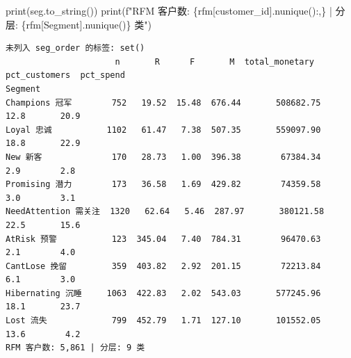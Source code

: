 \documentclass[
]{ctexart}
\newenvironment{Shaded}{\begin{snugshade}}{\end{snugshade}}
\newcommand{\BuiltInTok}[1]{\textcolor[rgb]{0.00,0.23,0.31}{#1}}
\newcommand{\NormalTok}[1]{\textcolor[rgb]{0.00,0.23,0.31}{#1}}
\newcommand{\SpecialCharTok}[1]{\textcolor[rgb]{0.37,0.37,0.37}{#1}}
\newcommand{\SpecialStringTok}[1]{\textcolor[rgb]{0.13,0.47,0.30}{#1}}
\newcommand{\StringTok}[1]{\textcolor[rgb]{0.13,0.47,0.30}{#1}}
\begin{document}
\begin{Shaded}
\begin{Highlighting}[]
\BuiltInTok{print}\NormalTok{(seg.to\_string())}
\BuiltInTok{print}\NormalTok{(}\SpecialStringTok{f"RFM 客户数: }\SpecialCharTok{\{}\NormalTok{rfm[}\StringTok{\textquotesingle{}customer\_id\textquotesingle{}}\NormalTok{]}\SpecialCharTok{.}\NormalTok{nunique()}\SpecialCharTok{:,\}}\SpecialStringTok{ | 分层: }\SpecialCharTok{\{}\NormalTok{rfm[}\StringTok{\textquotesingle{}Segment\textquotesingle{}}\NormalTok{]}\SpecialCharTok{.}\NormalTok{nunique()}\SpecialCharTok{\}}\SpecialStringTok{ 类"}\NormalTok{)}
\end{Highlighting}
\end{Shaded}

\begin{verbatim}
未列入 seg_order 的标签: set()
                      n       R      F       M  total_monetary  pct_customers  pct_spend
Segment                                                                                 
Champions 冠军        752   19.52  15.48  676.44       508682.75           12.8       20.9
Loyal 忠诚           1102   61.47   7.38  507.35       559097.90           18.8       22.9
New 新客              170   28.73   1.00  396.38        67384.34            2.9        2.8
Promising 潜力        173   36.58   1.69  429.82        74359.58            3.0        3.1
NeedAttention 需关注  1320   62.64   5.46  287.97       380121.58           22.5       15.6
AtRisk 预警           123  345.04   7.40  784.31        96470.63            2.1        4.0
CantLose 挽留         359  403.82   2.92  201.15        72213.84            6.1        3.0
Hibernating 沉睡     1063  422.83   2.02  543.03       577245.96           18.1       23.7
Lost 流失             799  452.79   1.71  127.10       101552.05           13.6        4.2
RFM 客户数: 5,861 | 分层: 9 类
\end{verbatim}
\end{document}
